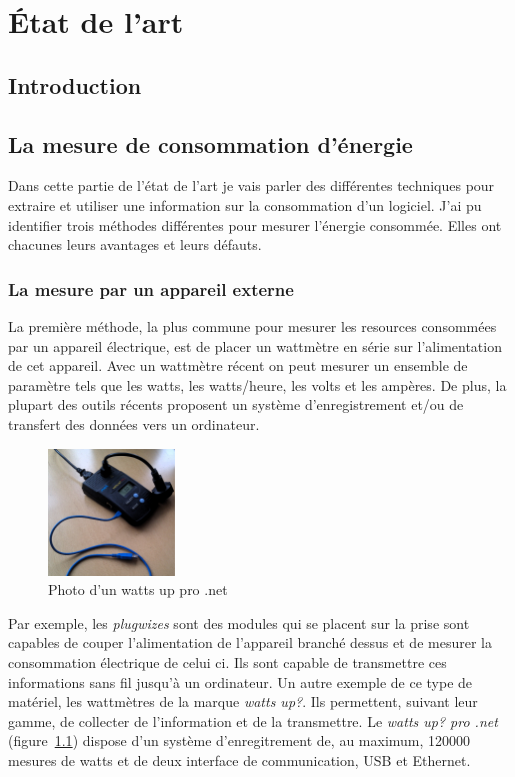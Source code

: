 \documentclass[a4paper, 11pt]{report}
\begin{document}
\chapter{État de l'art}
	\section{Introduction}

	\section{La mesure de consommation d'énergie}
Dans cette partie de l'état de l'art je vais parler des différentes techniques pour extraire et utiliser une information sur la consommation d'un logiciel. J'ai pu identifier trois méthodes différentes pour mesurer l'énergie consommée. Elles ont chacunes leurs avantages et leurs défauts.
			\subsection{La mesure par un appareil externe}
La première méthode, la plus commune pour mesurer les resources consommées par un appareil électrique, est de placer un wattmètre en série sur l'alimentation de cet appareil. Avec un wattmètre récent on peut mesurer un ensemble de paramètre tels que les watts, les watts/heure, les volts et les ampères. De plus, la plupart des outils récents proposent un système d'enregistrement et/ou de transfert des données vers un ordinateur.

\begin{figure}
		\includegraphics[width=0.3\textwidth]{figures/wattsUp}
		\caption{Photo d'un watts up pro .net}
		\label{wattsUp}
\end{figure}

Par exemple, les \textit{plugwizes} sont des modules qui se placent sur la prise sont capables de couper l'alimentation de l'appareil branché dessus et de mesurer la consommation électrique de celui ci. Ils sont capable de transmettre ces informations sans fil jusqu'à un ordinateur. Un autre exemple de ce type de matériel, les wattmètres de la marque \textit{watts up\/?}. Ils permettent, suivant leur gamme, de collecter de l'information et de la transmettre. Le \textit{watts up\/? pro .net} (figure~\ref{wattsUp}) dispose d'un système d'enregitrement de, au maximum, 120000 mesures de watts et de deux interface de communication, USB et Ethernet.
\end{document}
